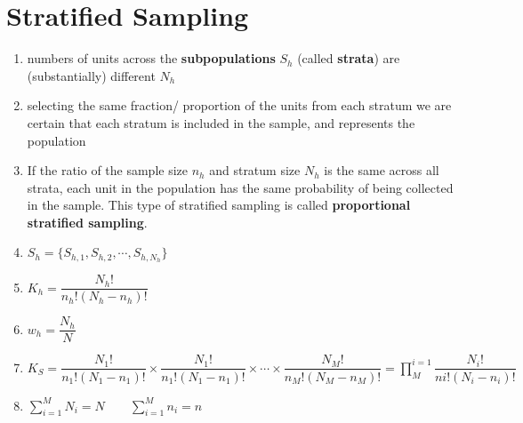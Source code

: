 \section{Stratified Sampling \cite{ism-1}}\label{Stratified Sampling}

\begin{enumerate}
    \item numbers of units across the \textbf{subpopulations} $S_h$ (called \textbf{strata}) are (substantially) different $N_h$

    \item selecting the same fraction/ proportion of the units from each stratum we are certain that each stratum is included in the sample, and represents the population

    \item If the ratio of the sample size $n_h$ and stratum size $N_h$ is the same across all strata, each unit in the population has the same probability of being collected in the sample. This type of stratified sampling is called \textbf{proportional stratified sampling}.

    \item[] $S_h = \{ S_{h,1}, S_{h,2},\cdots, S_{h,N_h} \}$

    \item[] $K_h = \dfrac{N_h!}{n_h!(N_h-n_h)!}$

    \item[] $w_h = \dfrac{N_h}{N}$

    \item[] $
        K_S = 
        \dfrac{N_1!}{n_1!(N_1-n_1)!} 
        \times
        \dfrac{N_1!}{n_1!(N_1-n_1)!} 
        \times
        \cdots
        \times
        \dfrac{N_M!}{n_M!(N_M-n_M)!}
        =
        \displaystyle\prod_{M}^{i=1} \dfrac{N_i!}{ni!(N_i-n_i)!}
    $

    \item[] $
        \displaystyle\sum_{i=1}^{M} N_i = N
        \quad\quad
        \displaystyle\sum_{i=1}^{M} n_i = n
    $


\end{enumerate}


